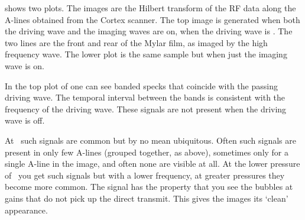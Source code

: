  shows two plots.
The images are the Hilbert transform of the RF data along the A-lines obtained from the Cortex scanner.
%
The top image is generated when both the driving wave and the imaging waves are on,
when the driving wave is \dbThirty.
The two lines are the front and rear of the Mylar film, as imaged by the high frequency wave.
The lower plot is the same sample but when just the imaging wave is on.


In the top plot of  one can see banded specks that coincide  with the passing  driving wave.  
The temporal interval between the bands is consistent with the frequency of the driving wave.
These signals are not present when the driving wave is off. %

At \dbThirty\  such signals are  common but by no mean ubiquitous.
Often such signals are present in only  few A-lines (grouped together, as above), sometimes only for a single A-line in the image, and often none are visible at all.
At the lower pressure of \dbThirtyTwo\ you get such signals but with a lower frequency,
at greater pressures they become more common.
The \dbThirty signal has the property that you see  the bubbles at gains that  do not pick up the direct transmit.
This gives the images its `clean' appearance.





